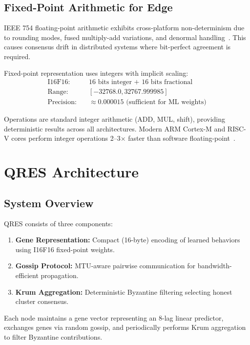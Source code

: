 \documentclass[conference,10pt]{IEEEtran}
\begin{document}
\subsection{Fixed-Point Arithmetic for Edge}
IEEE 754 floating-point arithmetic exhibits cross-platform non-determinism due to rounding modes, fused multiply-add variations, and denormal handling~\cite{goldberg1991every}. This causes consensus drift in distributed systems where bit-perfect agreement is required.

Fixed-point representation uses integers with implicit scaling:
\begin{align*}
\text{I16F16:} & \quad \text{16 bits integer + 16 bits fractional} \\
\text{Range:} & \quad [-32768.0, 32767.999985] \\
\text{Precision:} & \quad \approx 0.000015 \text{ (sufficient for ML weights)}
\end{align*}


Operations are standard integer arithmetic (ADD, MUL, shift), providing deterministic results across all architectures. Modern ARM Cortex-M and RISC-V cores perform integer operations 2--3$\times$ faster than software floating-point~\cite{banner2018scalable}.

\section{QRES Architecture}
\label{sec:architecture}

\subsection{System Overview}
QRES consists of three components:
\begin{enumerate}
    \item \textbf{Gene Representation:} Compact (16-byte) encoding of learned behaviors using I16F16 fixed-point weights.
    \item \textbf{Gossip Protocol:} MTU-aware pairwise communication for bandwidth-efficient propagation.
    \item \textbf{Krum Aggregation:} Deterministic Byzantine filtering selecting honest cluster consensus.
\end{enumerate}

Each node maintains a gene vector representing an 8-lag linear predictor, exchanges genes via random gossip, and periodically performs Krum aggregation to filter Byzantine contributions.
\end{document}
